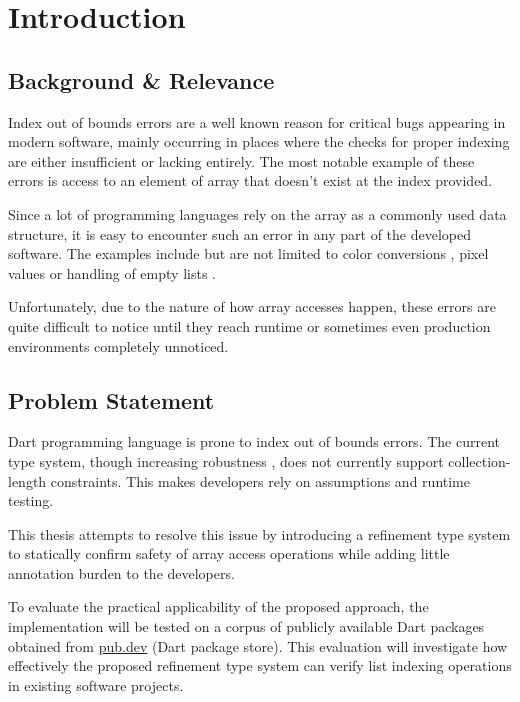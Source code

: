 \chapter{Introduction}
\label{chap:intro}
\section{Background \& Relevance}
\label{sec:background_and_relevance}

Index out of bounds errors are a well known reason for critical bugs appearing
in modern software, mainly occurring in places where the checks for proper indexing 
are either insufficient or lacking entirely. The most notable example of these errors
is access to an element of array that doesn't exist at the index provided.

Since a lot of programming languages rely on the array as a commonly used data structure,
it is easy to encounter such an error in any part of the developed software.
The examples include but are not limited to color conversions \cite{bazinacRangeErrorIndexIndex2021} \cite{ChangelogWidgetrecodingpluginVersion},
pixel values \cite{volginIndexOutBounds2018} or handling of empty lists \cite{ngotruongthanhSyncfusion_flutter_datagridErrorRangeError2024}.

Unfortunately, due to the nature of how array accesses happen, these errors are quite difficult to notice until they reach 
runtime or sometimes even production environments completely unnoticed.


\section{Problem Statement}
\label{sec:problem_statement}
Dart programming language is prone to index out of bounds errors. The current type system, 
though increasing robustness \cite{DartlangLanguage2026}, does not currently support  
collection-length constraints. This makes developers rely on assumptions and runtime testing.

This thesis attempts to resolve this issue by introducing a refinement type system to statically
confirm safety of array access operations while adding little annotation burden to the developers.

To evaluate the practical applicability of the proposed
approach, the implementation will be tested on a corpus
of publicly available Dart packages obtained from \href{pub.dev}{pub.dev} (Dart package store).
This evaluation will investigate how effectively the
proposed refinement type system can verify list indexing
operations in existing software projects.

